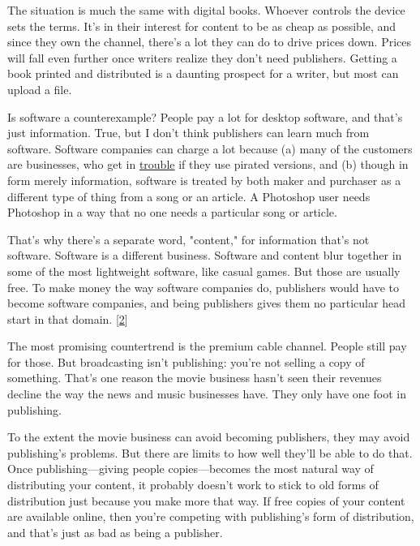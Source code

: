 The
                  situation is much the same with digital books. Whoever
                  controls the device sets the terms. It's in their interest for
                  content to be as cheap as possible, and since they own the
                  channel, there's a lot they can do to drive prices down.
                  Prices will fall even further once writers realize they don't
                  need publishers. Getting a book printed and distributed is a
                  daunting prospect for a writer, but most can upload a file.

Is
                  software a counterexample? People pay a lot for desktop
                  software, and that's just information. True, but I don't think
                  publishers can learn much from software. Software companies
                  can charge a lot because (a) many of the customers are
                  businesses, who get in
                  \href{http://www.bsa.org/country/News\%20and\%20Events/News\%20Archives/en/2009/en-08312009-mueller.aspx?sc\_lang=en}{trouble}
                  if they use pirated versions, and (b) though in form merely
                  information, software is treated by both maker and purchaser
                  as a different type of thing from a song or an article. A
                  Photoshop user needs Photoshop in a way that no one needs a
                  particular song or article.

That's why there's a
                  separate word, "content," for information that's not software.
                  Software is a different business. Software and content blur
                  together in some of the most lightweight software, like casual
                  games. But those are usually free. To make money the way
                  software companies do, publishers would have to become
                  software companies, and being publishers gives them no
                  particular head start in that domain.
                  [\href{\#f2n}{2}]

The most promising countertrend is the premium
                  cable channel. People still pay for those. But broadcasting
                  isn't publishing: you're not selling a copy of something.
                  That's one reason the movie business hasn't seen their
                  revenues decline the way the news and music businesses have.
                  They only have one foot in publishing.

To the
                  extent the movie business can avoid becoming publishers, they
                  may avoid publishing's problems. But there are limits to how
                  well they'll be able to do that. Once publishing---giving
                  people copies---becomes the most natural way of
                  distributing your content, it probably doesn't work to stick
                  to old forms of distribution just because you make more that
                  way. If free copies of your content are available online, then
                  you're competing with publishing's form of distribution, and
                  that's just as bad as being a publisher.


